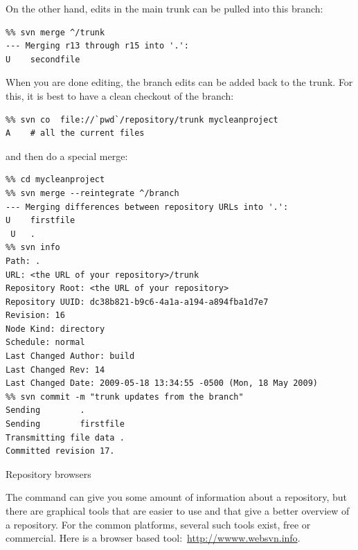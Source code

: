 On the other hand, edits in the main trunk can be pulled into this
branch:
\begin{verbatim}
%% svn merge ^/trunk
--- Merging r13 through r15 into '.':
U    secondfile
\end{verbatim}
When you are done editing, the branch edits can be added back to the
trunk. For this, it is best to have a clean checkout of the branch:
\begin{verbatim}
%% svn co  file://`pwd`/repository/trunk mycleanproject
A    # all the current files
\end{verbatim}
and then do a special merge:
\begin{verbatim}
%% cd mycleanproject
%% svn merge --reintegrate ^/branch
--- Merging differences between repository URLs into '.':
U    firstfile
 U   .
%% svn info
Path: .
URL: <the URL of your repository>/trunk
Repository Root: <the URL of your repository>
Repository UUID: dc38b821-b9c6-4a1a-a194-a894fba1d7e7
Revision: 16
Node Kind: directory
Schedule: normal
Last Changed Author: build
Last Changed Rev: 14
Last Changed Date: 2009-05-18 13:34:55 -0500 (Mon, 18 May 2009)
%% svn commit -m "trunk updates from the branch"
Sending        .
Sending        firstfile
Transmitting file data .
Committed revision 17.
\end{verbatim}

 {Repository browsers}

The  command can give you some amount of information about a
repository, but there are graphical tools that are easier to use and
that give a better overview of a repository. For the common platforms,
several such tools exist, free or commercial. Here is a browser based
tool:~\url{http://wwww.websvn.info}.



\endinput

\Level 0 {Other source control systems}

Lately, there has been considerable interest in `distributed source
code control' system, such as \indexterm{git} or
\indexterm{mercurial}. In these systems, each user has a local
repository against which commits can be made. This has some advantages
over systems like \n{svn}.

Consider the case where a developer is working on a  patch that takes some
time to code and test. During this time, development on the project
goes on, and by the time the patch can be commited, too many changes
have been made for \n{svn} to be able to merge the patch. As a result,
branching and merging is often a frustrating experience with
traditional system. In distributed systems, the developer can do
commits against the local repository, and roll back versions as
needed. Additionally, when the patch is ready to merge back, it is not
a single massive change, but a sequence of small changes, which the
source control system should be better able to handle.

